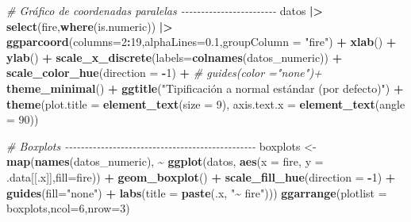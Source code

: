 \documentclass[12pt,a4paper,]{book}
\newenvironment{Shaded}{\begin{snugshade}}{\end{snugshade}}
\newcommand{\AttributeTok}[1]{\textcolor[rgb]{0.13,0.29,0.53}{#1}}
\newcommand{\CommentTok}[1]{\textcolor[rgb]{0.56,0.35,0.01}{\textit{#1}}}
\newcommand{\DecValTok}[1]{\textcolor[rgb]{0.00,0.00,0.81}{#1}}
\newcommand{\FloatTok}[1]{\textcolor[rgb]{0.00,0.00,0.81}{#1}}
\newcommand{\FunctionTok}[1]{\textcolor[rgb]{0.13,0.29,0.53}{\textbf{#1}}}
\newcommand{\NormalTok}[1]{#1}
\newcommand{\OtherTok}[1]{\textcolor[rgb]{0.56,0.35,0.01}{#1}}
\newcommand{\SpecialCharTok}[1]{\textcolor[rgb]{0.81,0.36,0.00}{\textbf{#1}}}
\newcommand{\StringTok}[1]{\textcolor[rgb]{0.31,0.60,0.02}{#1}}
\numberwithin{dummy}{section}
\theoremstyle{ocrenumbox}
\theoremstyle{blacknumex}
\theoremstyle{blacknumbox}
\theoremstyle{ocrenum}
\theoremstyle{ocrenum}
\begin{document}
\begin{Shaded}
\begin{Highlighting}[]
\CommentTok{\# Gráfico de coordenadas paralelas {-}{-}{-}{-}{-}{-}{-}{-}{-}{-}{-}{-}{-}{-}{-}{-}{-}{-}{-}{-}{-}{-}{-}{-}}
\NormalTok{datos }\SpecialCharTok{|\textgreater{}} 
  \FunctionTok{select}\NormalTok{(fire,}\FunctionTok{where}\NormalTok{(is.numeric)) }\SpecialCharTok{|\textgreater{}} 
  \FunctionTok{ggparcoord}\NormalTok{(}\AttributeTok{columns=}\DecValTok{2}\SpecialCharTok{:}\DecValTok{19}\NormalTok{,}\AttributeTok{alphaLines=}\FloatTok{0.1}\NormalTok{,}\AttributeTok{groupColumn =} \StringTok{"fire"}\NormalTok{) }\SpecialCharTok{+}
  \FunctionTok{xlab}\NormalTok{(}\StringTok{\textquotesingle{}\textquotesingle{}}\NormalTok{) }\SpecialCharTok{+} 
  \FunctionTok{ylab}\NormalTok{(}\StringTok{\textquotesingle{}\textquotesingle{}}\NormalTok{) }\SpecialCharTok{+} 
  \FunctionTok{scale\_x\_discrete}\NormalTok{(}\AttributeTok{labels=}\FunctionTok{colnames}\NormalTok{(datos\_numeric)) }\SpecialCharTok{+}
  \FunctionTok{scale\_color\_hue}\NormalTok{(}\AttributeTok{direction =} \SpecialCharTok{{-}}\DecValTok{1}\NormalTok{) }\SpecialCharTok{+}
  \CommentTok{\# guides(color ="none")+}
  \FunctionTok{theme\_minimal}\NormalTok{() }\SpecialCharTok{+} 
  \FunctionTok{ggtitle}\NormalTok{(}\StringTok{"Tipificación a normal estándar (por defecto)"}\NormalTok{) }\SpecialCharTok{+}
  \FunctionTok{theme}\NormalTok{(}\AttributeTok{plot.title =} \FunctionTok{element\_text}\NormalTok{(}\AttributeTok{size =} \DecValTok{9}\NormalTok{),}
        \AttributeTok{axis.text.x =} \FunctionTok{element\_text}\NormalTok{(}\AttributeTok{angle =} \DecValTok{90}\NormalTok{))}

\CommentTok{\# Boxplots {-}{-}{-}{-}{-}{-}{-}{-}{-}{-}{-}{-}{-}{-}{-}{-}{-}{-}{-}{-}{-}{-}{-}{-}{-}{-}{-}{-}{-}{-}{-}{-}{-}{-}{-}{-}{-}{-}{-}{-}{-}{-}{-}{-}{-}{-}{-}{-}}
\NormalTok{boxplots }\OtherTok{\textless{}{-}} \FunctionTok{map}\NormalTok{(}\FunctionTok{names}\NormalTok{(datos\_numeric), }\SpecialCharTok{\textasciitilde{}} \FunctionTok{ggplot}\NormalTok{(datos, }\FunctionTok{aes}\NormalTok{(}\AttributeTok{x =}\NormalTok{ fire, }\AttributeTok{y =}\NormalTok{ .data[[.x]],}\AttributeTok{fill=}\NormalTok{fire)) }\SpecialCharTok{+}
                  \FunctionTok{geom\_boxplot}\NormalTok{() }\SpecialCharTok{+}
                  \FunctionTok{scale\_fill\_hue}\NormalTok{(}\AttributeTok{direction =} \SpecialCharTok{{-}}\DecValTok{1}\NormalTok{) }\SpecialCharTok{+}
                  \FunctionTok{guides}\NormalTok{(}\AttributeTok{fill=}\StringTok{"none"}\NormalTok{) }\SpecialCharTok{+}
                  \FunctionTok{labs}\NormalTok{(}\AttributeTok{title =} \FunctionTok{paste}\NormalTok{(.x, }\StringTok{"\textasciitilde{} fire"}\NormalTok{)))}
\FunctionTok{ggarrange}\NormalTok{(}\AttributeTok{plotlist =}\NormalTok{ boxplots,}\AttributeTok{ncol=}\DecValTok{6}\NormalTok{,}\AttributeTok{nrow=}\DecValTok{3}\NormalTok{)}


\end{Highlighting}
\end{Shaded}
\end{document}
